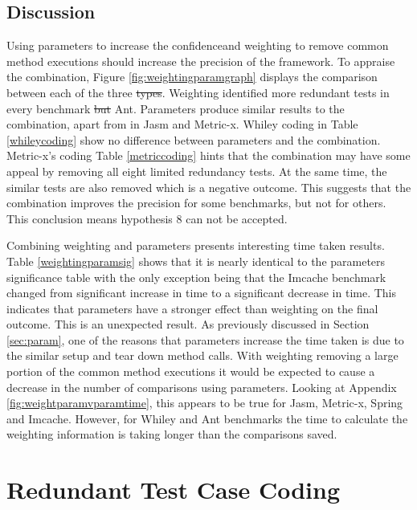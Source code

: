 \documentclass[11pt
              , a4paper
              , twoside
              , openright
              ]{report}
\providecommand{\DIFadd}[1]{{\protect\color{blue}\uwave{#1}}} %
\providecommand{\DIFdel}[1]{{\protect\color{red}\sout{#1}}}                      %
\providecommand{\DIFaddbegin}{} %
\providecommand{\DIFaddend}{} %
\providecommand{\DIFdelbegin}{} %
\providecommand{\DIFdelend}{} %
\begin{document}
\subsection{Discussion}
Using parameters to increase the confidence\DIFaddbegin \DIFadd{, }\DIFaddend and weighting to remove common method executions should increase the precision of the framework. To appraise the combination, Figure \ref{fig:weightingparamgraph} displays the comparison between each of the three \DIFdelbegin \DIFdel{types}\DIFdelend \DIFaddbegin \DIFadd{techniques}\DIFaddend . Weighting identified more redundant tests in every benchmark \DIFdelbegin \DIFdel{but }\DIFdelend \DIFaddbegin \DIFadd{except }\DIFaddend Ant. Parameters produce similar results to the combination, apart from in Jasm and Metric-x. Whiley coding in Table \ref{whileycoding} show no difference between parameters and the combination. Metric-x's coding Table \ref{metriccoding} hints that the combination may have some appeal by removing all eight limited redundancy tests. At the same time, the similar tests are also removed which is a negative outcome. This suggests that the combination improves the precision for some benchmarks, but not for others. This conclusion means hypothesis 8 can not be accepted. 

Combining weighting and parameters presents interesting time taken results. Table \ref{weightingparamsig} shows that it is nearly identical to the parameters significance table with the only exception being that the Imcache benchmark changed from significant increase in time to a significant decrease in time. This indicates that parameters have a stronger effect than weighting on the final outcome. This is an unexpected result. As previously discussed in Section \ref{sec:param}, one of the reasons that parameters increase the time taken is due to the similar setup and tear down method calls. With weighting removing a large portion of the common method executions it would be expected to cause a decrease in the number of comparisons using parameters. Looking at Appendix \ref{fig:weightparamvparamtime}, this appears to be true for Jasm, Metric-x, Spring and Imcache. However, for Whiley and Ant benchmarks the time to calculate the weighting information is taking longer than the comparisons saved. 

\section{Redundant Test Case Coding}
\end{document}
